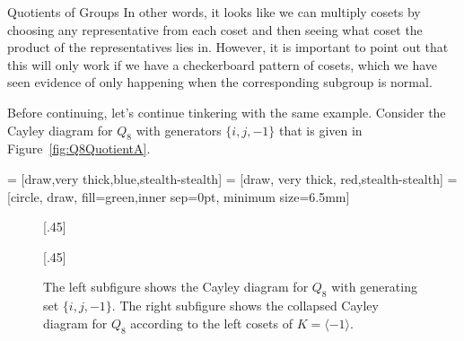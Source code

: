 \begin{section}{Quotients of Groups}
In other words, it looks like we can multiply cosets by choosing any representative from each coset and then seeing what coset the product of the representatives lies in.  However, it is important to point out that this will only work if we have a checkerboard pattern of cosets, which we have seen evidence of only happening when the corresponding subgroup is normal.

Before continuing, let's continue tinkering with the same example.  Consider the Cayley diagram for $Q_8$ with generators $\{i,j,-1\}$ that is given in Figure~\ref{fig:Q8QuotientA}.

 = [draw,very thick,blue,stealth-stealth]
 = [draw, very thick, red,stealth-stealth]
 = [circle, draw, fill=green,inner sep=0pt, minimum size=6.5mm]

\begin{figure}[!ht]
\centering
\subcaptionbox{\label{fig:Q8QuotientA}}[.45\textwidth]{
}
\subcaptionbox{\label{fig:Q8QuotientB}}[.45\textwidth]{
}
\caption{The left subfigure shows the Cayley diagram for $Q_8$ with generating set $\{i,j,-1\}$. The right subfigure shows the collapsed Cayley diagram for $Q_8$ according to the left cosets of $K=\langle -1\rangle$.}
\label{fig:Q8Repeat}
\end{figure}


\end{section}
